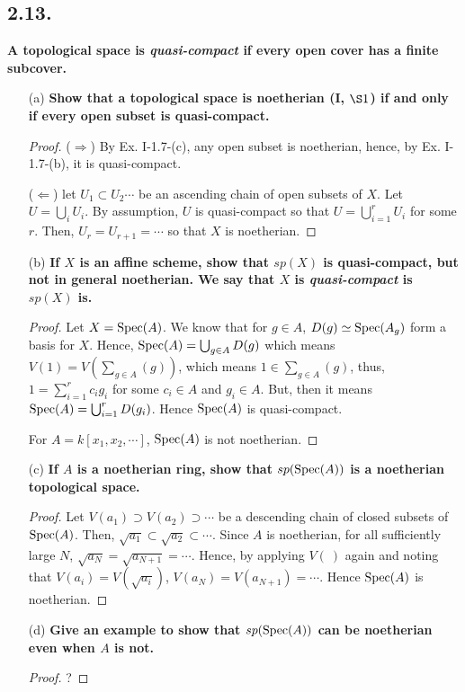 \documentclass[11pt]{amsart}          %
\newcommand{\spec}{{\rm Spec}}
\begin{document}
\subsection*{2.13.}\textbf{A topological space is {\it quasi-compact} if every open cover has a finite subcover.}
\begin{enumerate}
\item [(a)] \textbf{Show that a topological space is noetherian (I, $\S 1$) if and only if every open subset is quasi-compact.}

\begin{proof}($\Rightarrow$) By Ex. I-1.7-(c), any open subset is noetherian, hence, by Ex. I-1.7-(b), it is quasi-compact.

($\Leftarrow$) let $U_1 \subset U_2 \cdots$ be an ascending chain of open subsets of $X$. Let $U = \bigcup_i U_i$. By assumption, $U$ is quasi-compact so that $U = \bigcup_{i=1} ^r U_i$ for some $r$. Then, $U_r = U_{r+1} = \cdots$ so that $X$ is noetherian.\end{proof}

\item [(b)] \textbf{If $X$ is an affine scheme, show that $sp (X)$ is quasi-compact, but not in general noetherian. We say that $X$ is {\it quasi-compact} is $sp(X)$ is.}

\begin{proof}Let $X = \spec (A)$. We know that for $g \in A$, $D(g) \simeq \spec (A_g)$ form a basis for $X$. Hence, $\spec (A) = \bigcup _{g \in A} D(g)$ which means $V(1) = V \left( \sum_{g \in A} (g) \right)$, which means $1 \in \sum_{g \in A} (g)$, thus, $1 = \sum_{i=1} ^r c_i g_i$ for some $c_i \in A$ and $g_i \in A$. But, then it means $\spec (A) = \bigcup_{i=1} ^r D(g_i)$. Hence $\spec(A)$ is quasi-compact. 

For $A = k[x_1, x_2, \cdots ]$, $\spec (A)$ is not noetherian.\end{proof}

\item [(c)] \textbf{If $A$ is a noetherian ring, show that $sp(\spec (A))$ is a noetherian topological space.}

\begin{proof}Let $V(a_1) \supset V(a_2) \supset \cdots$ be a descending chain of closed subsets of $\spec (A)$. Then, $\sqrt{a_1} \subset \sqrt{a_2} \subset \cdots$. Since $A$ is noetherian, for all sufficiently large $N$, $\sqrt{a_N} = \sqrt{a_{N+1}} = \cdots$. Hence, by applying $V ( \ )$ again and noting that $V(a_i) = V(\sqrt{ a_i})$, $V(a_N) = V(a_{N+1}) = \cdots$. Hence $\spec(A)$ is noetherian.\end{proof}

\item [(d)] \textbf{Give an example to show that $sp (\spec (A))$ can be noetherian even when $A$ is not.}
\begin{proof} ?\end{proof}
\end{enumerate}
\end{document}
